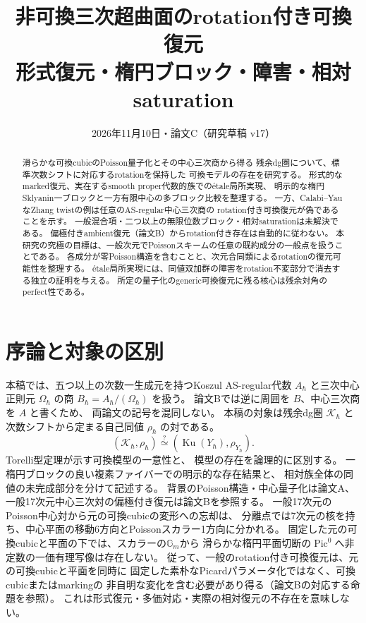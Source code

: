 
\title{非可換三次超曲面のrotation付き可換復元\\
\large 形式復元・楕円ブロック・障害・相対saturation}
\author{}
\date{2026年11月10日・論文C（研究草稿 v17）}

\maketitle
\begin{abstract}
滑らかな可換cubicのPoisson量子化とその中心三次商から得る
残余dg圏について、標準次数シフトに対応するrotationを保持した
可換モデルの存在を研究する。
形式的なmarked復元、実在するsmooth proper代数的族でのétale局所実現、
明示的な楕円Sklyanin一ブロックと一方有限中心の多ブロック比較を整理する。
一方、Calabi--YauなZhang twistの例は任意のAS-regular中心三次商の
rotation付き可換復元が偽であることを示す。
一般混合項・二つ以上の無限位数ブロック・相対saturationは未解決である。
偏極付きambient復元（論文B）からrotation付き存在は自動的に従わない。
本研究の究極の目標は、一般次元でPoissonスキームの任意の既約成分の一般点を扱うことである。
各成分が零Poisson構造を含むことと、次元合同類によるrotationの復元可能性を整理する。
étale局所実現には、同値双加群の障害をrotation不変部分で消去する独立の証明を与える。
所定の量子化のgeneric可換復元に残る核心は残余対角のperfect性である。
\end{abstract}
\tableofcontents
\section{序論と対象の区別}\label{sec:paperC-introduction}
本稿では、五つ以上の次数一生成元を持つKoszul AS-regular代数
\(A_\hbar\) と三次中心正則元 \(\Omega_\hbar\) の商
\(B_\hbar=A_\hbar/(\Omega_\hbar)\) を扱う。
論文Bでは逆に周囲を \(B\)、中心三次商を \(A\) と書くため、
両論文の記号を混同しない。
本稿の対象は残余dg圏 \(\mathcal K_\hbar\) と
次数シフトから定まる自己同値 \(\rho_\hbar\) の対である。
\[
 (\mathcal K_\hbar,\rho_\hbar)
 \stackrel{?}{\simeq}
 (\operatorname{Ku}(Y_\hbar),\rho_{Y_\hbar}).
\]
Torelli型定理が示す可換模型の一意性と、
模型の存在を論理的に区別する。
一楕円ブロックの良い複素ファイバーでの明示的な存在結果と、
相対族全体の同値の未完成部分を分けて記述する。
背景のPoisson構造・中心量子化は論文A、
一般17次元中心三次対の偏極付き復元は論文Bを参照する。
一般17次元のPoisson中心対から元の可換cubicの変形への忘却は、
分離点では7次元の核を持ち、中心平面の移動6方向とPoissonスカラー1方向に分かれる。
固定した元の可換cubicと平面の下では、スカラーの\(\mathbb G_m\)から
滑らかな楕円平面切断の\(\operatorname{Pic}^0\)へ非定数の一価有理写像は存在しない。
従って、一般のrotation付き可換復元は、元の可換cubicと平面を同時に
固定した素朴なPicardパラメータ化ではなく、可換cubicまたはmarkingの
非自明な変化を含む必要があり得る（論文Bの対応する命題を参照）。
これは形式復元・多価対応・実際の相対復元の不存在を意味しない。











